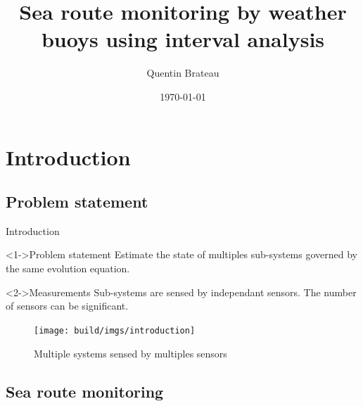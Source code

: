 \documentclass{beamer}
\title{Sea route monitoring by weather buoys using interval analysis}
\date{\today}
\author{Quentin Brateau}
\institute{ENSTA Bretagne}
\begin{document}
    \maketitle

    \section{Introduction}

        \subsection{Problem statement}

            \begin{frame}{Introduction}
                \begin{minipage}{0.55\textwidth}
                    \begin{block}<1->{Problem statement}
                        Estimate the state of multiples sub-systems governed by the same evolution equation.
                    \end{block}
                    \begin{block}<2->{Measurements}
                        Sub-systems are sensed by independant sensors. The number of sensors can be significant.
                    \end{block}
                \end{minipage}
                \hfill
                \begin{minipage}{0.4\textwidth}
                    \begin{figure}
                        \texttt{[image: build/imgs/introduction]}
                        \caption{Multiple systems sensed by multiples sensors}
                    \end{figure}
                \end{minipage}
            \end{frame}

        \subsection{Sea route monitoring}
\end{document}
